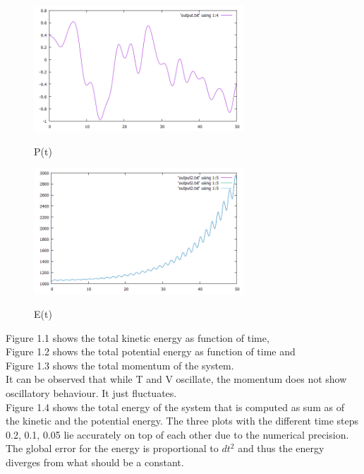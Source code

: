 \documentclass[12pt,a4paper]{article}	%
\begin{document}
\begin{figure}[h!]	
\centering
{\includegraphics[width=0.7\textwidth]{P100part.png}}		
\caption{P(t)}
\end{figure}


\begin{figure}[h!]	
\centering
{\includegraphics[width=0.7\textwidth]{3en2.png}}		
\caption{E(t)}
\end{figure}

\newpage 

Figure 1.1 shows the total kinetic energy as function of time,\\
Figure 1.2 shows the total potential energy as function of time and\\
Figure 1.3 shows the total momentum of the system. \\
It can be observed that while T and V oscillate, the momentum does not show oscillatory behaviour. It just fluctuates. \\

Figure 1.4 shows the total energy of the system that is computed as sum as of the kinetic and the potential energy. The three plots with the different time steps 0.2, 0.1, 0.05 lie accurately on top of each other due to the numerical precision. The global error for the energy is proportional to $dt^2$ and thus the energy diverges from what should be a constant. 
\end{document}
